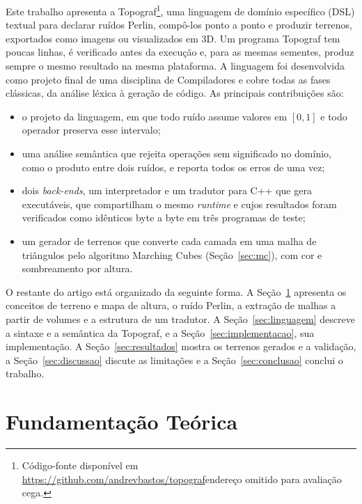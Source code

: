 \documentclass[sigconf, nonacm, screen, language=portuguese, language={main=english}]{acmart}
\newcommand{\anonfinal}[2]{\ifdefined\versaofinal#2\else#1\fi}
\begin{document}
Este trabalho apresenta a Topograf\footnote{Código-fonte disponível em \anonfinal{endereço omitido para avaliação cega}{\url{https://github.com/andrevbastos/topograf}}.}, uma linguagem de domínio específico
(DSL) textual para declarar ruídos Perlin, compô-los ponto a ponto e
produzir terrenos, exportados como imagens ou visualizados em 3D. Um
programa Topograf tem poucas linhas, é verificado antes da execução e,
para as mesmas sementes, produz sempre o mesmo resultado na mesma
plataforma. A linguagem
foi desenvolvida como projeto final de uma disciplina de Compiladores e
cobre todas as fases clássicas, da análise léxica à geração de código.
As principais contribuições são:
\begin{itemize}
  \item o projeto da linguagem, em que todo ruído assume valores em
        $[0,1]$ e todo operador preserva esse intervalo;
  \item uma análise semântica que rejeita operações sem significado no
        domínio, como o produto entre dois ruídos, e reporta todos os
        erros de uma vez;
  \item dois \textit{back-ends}, um interpretador e um tradutor para
        C++ que gera executáveis, que compartilham o mesmo
        \textit{runtime} e cujos resultados foram verificados como
        idênticos byte a byte em três programas de teste;
  \item um gerador de terrenos que converte cada camada em uma malha de
        triângulos pelo algoritmo Marching Cubes
        (Seção~\ref{sec:mc}), com cor e sombreamento por altura.
\end{itemize}

O restante do artigo está organizado da seguinte forma. A
Seção~\ref{sec:fundamentacao} apresenta os conceitos de terreno e mapa
de altura, o ruído Perlin, a extração de malhas a partir de volumes e a
estrutura de um tradutor. A
Seção~\ref{sec:linguagem} descreve a sintaxe e a semântica da Topograf, e
a Seção~\ref{sec:implementacao}, sua implementação. A
Seção~\ref{sec:resultados} mostra os terrenos gerados e a validação, a
Seção~\ref{sec:discussao} discute as limitações e a
Seção~\ref{sec:conclusao} conclui o trabalho.

\section{Fundamentação Teórica}\label{sec:fundamentacao}
\end{document}
